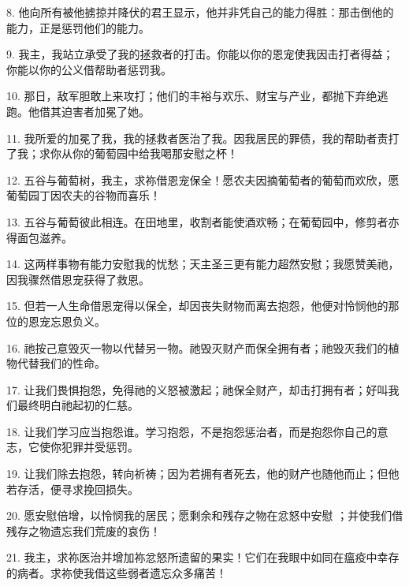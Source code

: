 8. 他向所有被他掳掠并降伏的君王显示，他并非凭自己的能力得胜：那击倒他的能力，正是惩罚他们的能力。\par

9. 我主，我站立承受了我的拯救者的打击。你能以你的恩宠使我因击打者得益；你能以你的公义借帮助者惩罚我。\par

10. 那日，敌军胆敢上来攻打；他们的丰裕与欢乐、财宝与产业，都抛下弃绝逃跑。他借其迫害者加冕了她。\par

11. 我所爱的加冕了我，我的拯救者医治了我。因我居民的罪债，我的帮助者责打了我；求你从你的葡萄园中给我喝那安慰之杯！\par

12. 五谷与葡萄树，我主，求祢借恩宠保全！愿农夫因摘葡萄者的葡萄而欢欣，愿葡萄园丁因农夫的谷物而喜乐！\par

13. 五谷与葡萄彼此相连。在田地里，收割者能使酒欢畅；在葡萄园中，修剪者亦得面包滋养。\par

14. 这两样事物有能力安慰我的忧愁；天主圣三更有能力超然安慰；我愿赞美祂，因我骤然借恩宠获得了救恩。\par

15. 但若一人生命借恩宠得以保全，却因丧失财物而离去抱怨，他便对怜悯他的那位的恩宠忘恩负义。\par

16. 祂按己意毁灭一物以代替另一物。祂毁灭财产而保全拥有者；祂毁灭我们的植物代替我们的性命。\par

17. 让我们畏惧抱怨，免得祂的义怒被激起；祂保全财产，却击打拥有者；好叫我们最终明白祂起初的仁慈。\par

18. 让我们学习应当抱怨谁。学习抱怨，不是抱怨惩治者，而是抱怨你自己的意志，它使你犯罪并受惩罚。\par

19. 让我们除去抱怨，转向祈祷；因为若拥有者死去，他的财产也随他而止；但他若存活，便寻求挽回损失。\par

20. 愿安慰倍增，以怜悯我的居民；愿剩余和残存之物在忿怒中安慰 ；并使我们借残存之物遗忘我们荒废的哀伤！\par

21. 我主，求祢医治并增加祢忿怒所遗留的果实！它们在我眼中如同在瘟疫中幸存的病者。求祢使我借这些弱者遗忘众多痛苦！\par

